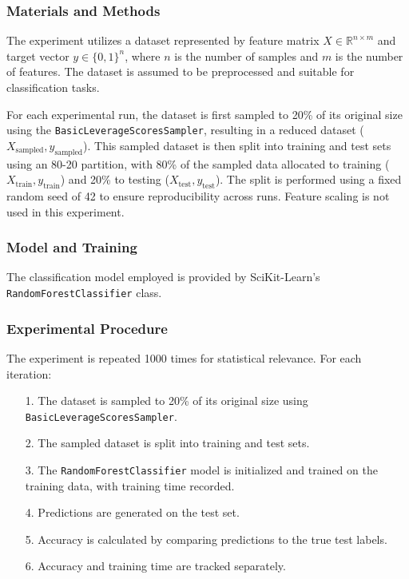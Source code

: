 \documentclass{article}
\theoremstyle{plain}
\theoremstyle{definition}
\theoremstyle{remark}
\begin{document}
\subsubsection{Materials and Methods}

The experiment utilizes a dataset represented by feature matrix $ X \in \mathbb{R}^{n \times m} $ and target vector $ y \in \{0, 1\}^n $, where $ n $ is the number of samples and $ m $ is the number of features. The dataset is assumed to be preprocessed and suitable for classification tasks.

For each experimental run, the dataset is first sampled to 20\% of its original size using the \texttt{BasicLeverageScoresSampler}, resulting in a reduced dataset ($ X_{\text{sampled}}, y_{\text{sampled}} $). This sampled dataset is then split into training and test sets using an 80-20 partition, with 80\% of the sampled data allocated to training ($ X_{\text{train}}, y_{\text{train}} $) and 20\% to testing ($ X_{\text{test}}, y_{\text{test}} $). The split is performed using a fixed random seed of 42 to ensure reproducibility across runs. Feature scaling is not used in this experiment.

\subsubsection{Model and Training}

The classification model employed is provided by SciKit-Learn's \texttt{RandomForestClassifier} class.

\subsubsection{Experimental Procedure}

The experiment is repeated 1000 times for statistical relevance. For each iteration:

\begin{itemize}
	\item [1.] The dataset is sampled to 20\% of its original size using \texttt{BasicLeverageScoresSampler}.
	\item [2.] The sampled dataset is split into training and test sets.
	\item [3.] The \texttt{RandomForestClassifier} model is initialized and trained on the training data, with training time recorded.
	\item [4.] Predictions are generated on the test set.
	\item [5.] Accuracy is calculated by comparing predictions to the true test labels.
	\item [6.] Accuracy and training time are tracked separately.
\end{itemize}
\end{document}
